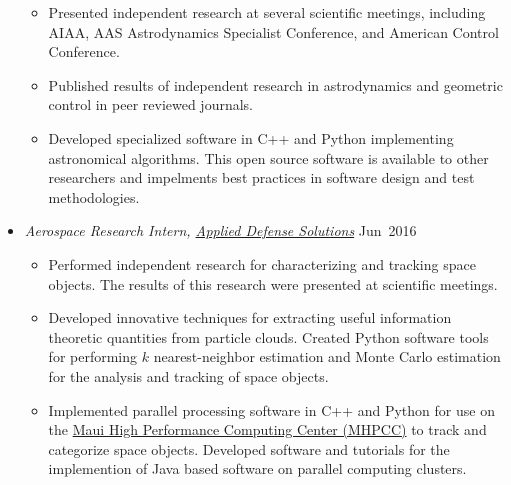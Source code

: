\begin{itemize}
\begin{itemize}
        \item Presented independent research at several scientific meetings, including AIAA, AAS Astrodynamics Specialist Conference, and American Control Conference.
        \item Published results of independent research in astrodynamics and geometric control in peer reviewed journals.
        \item Developed specialized software in C++ and Python implementing astronomical algorithms.
            This open source software is available to other researchers and impelments best practices in software design and test methodologies.
        \end{itemize}
        \item[] \textit{Aerospace Research Intern, \href{http://www.applieddefense.com/}{Applied Defense Solutions}} \hfill {Jun~2016}
        \begin{itemize}
            \item Performed independent research for characterizing and tracking space objects. The results of this research were presented at scientific meetings.
            \item Developed innovative techniques for extracting useful information theoretic quantities from particle clouds. 
            Created Python software tools for performing \(k\) nearest-neighbor estimation and Monte Carlo estimation for the analysis and tracking of space objects.
            \item Implemented parallel processing software in C++ and Python for use on the \href{https://www.mhpcc.hpc.mil/}{Maui High Performance Computing Center (MHPCC)} to track and categorize space objects.
            Developed software and tutorials for the implemention of Java based software on parallel computing clusters.
        \end{itemize}
    \end{itemize}
    
